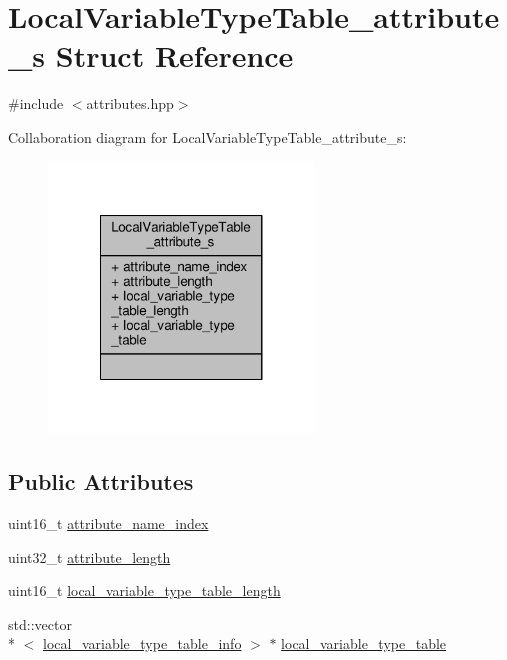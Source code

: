 \hypertarget{structLocalVariableTypeTable__attribute__s}{\section{Local\+Variable\+Type\+Table\+\_\+attribute\+\_\+s Struct Reference}
\label{structLocalVariableTypeTable__attribute__s}
}


{\ttfamily \#include $<$attributes.\+hpp$>$}



Collaboration diagram for Local\+Variable\+Type\+Table\+\_\+attribute\+\_\+s\+:\nopagebreak
\begin{figure}[H]
\begin{center}
\leavevmode
\includegraphics[width=200pt]{structLocalVariableTypeTable__attribute__s__coll__graph}
\end{center}
\end{figure}
\subsection*{Public Attributes}
\begin{DoxyCompactItemize}
\item 
uint16\+\_\+t \hyperlink{structLocalVariableTypeTable__attribute__s_a77c7af17b28fdfe081804f6d7b34a49a}{attribute\+\_\+name\+\_\+index}
\item 
uint32\+\_\+t \hyperlink{structLocalVariableTypeTable__attribute__s_abb4f2b3c349eb2362b044263de18d06e}{attribute\+\_\+length}
\item 
uint16\+\_\+t \hyperlink{structLocalVariableTypeTable__attribute__s_a5f9d25f73fd3f886bc1052974cce379d}{local\+\_\+variable\+\_\+type\+\_\+table\+\_\+length}
\item 
std\+::vector\\*
$<$ \hyperlink{attributes_8hpp_aa5d2134065f2de46fc36fad5e31190d4}{local\+\_\+variable\+\_\+type\+\_\+table\+\_\+info} $>$ $\ast$ \hyperlink{structLocalVariableTypeTable__attribute__s_ad8191d4a435b3c868512e32fce9b613a}{local\+\_\+variable\+\_\+type\+\_\+table}
\end{DoxyCompactItemize}


